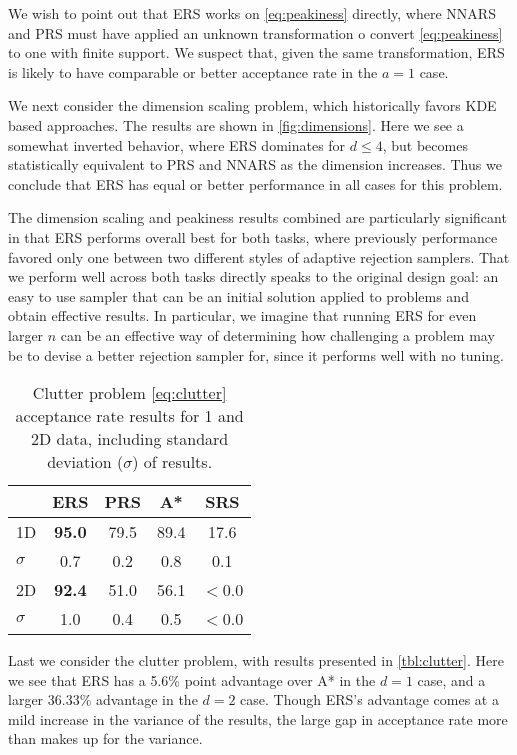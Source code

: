 \documentclass{ecai}  %
\begin{document}
We wish to point out that ERS works on \autoref{eq:peakiness} directly, where NNARS and PRS must have applied an unknown transformation o convert \autoref{eq:peakiness} to one with finite support. We suspect that, given the same transformation, ERS is likely to have comparable or better acceptance rate in the $a = 1$ case. 


We next consider the dimension scaling problem, which historically favors KDE based approaches.  The results are shown in \autoref{fig:dimensions}. Here we see a somewhat inverted behavior, where ERS dominates for $d \leq 4$, but becomes statistically equivalent to PRS and NNARS as the dimension increases. Thus we conclude that ERS has equal or better performance in all cases for this problem. 


The dimension scaling and peakiness results combined are particularly significant in that ERS performs overall best for both tasks, where previously performance favored only one between two different styles of adaptive rejection samplers. That we perform well across both tasks directly speaks to the original design goal: an easy to use sampler that can be an initial solution applied to problems and obtain effective results. In particular, we imagine that running ERS for even larger $n$ can be an effective way of determining how challenging a problem may be to devise a better rejection sampler for, since it performs well with no tuning. 

%
\begin{wraptable}[10]{r}{0.6\columnwidth}
\vspace{-15pt}
\centering
\caption{Clutter problem \autoref{eq:clutter} acceptance rate results for 1 and 2D data, including standard deviation  ($\sigma$) of results. } \label{tbl:clutter}
\begin{tabular}{@{}lcccc@{}}
\toprule
         & ERS  & PRS  & A*   & SRS  \\ \midrule
1D       & \textbf{95.0} & 79.5 & 89.4 & 17.6 \\
$\sigma$ & 0.7  & 0.2  & 0.8  & 0.1  \\
2D       & \textbf{92.4} & 51.0 & 56.1 & $<$0.0 \\
$\sigma$ & 1.0  & 0.4  & 0.5  & $<$0.0 \\ \bottomrule
\end{tabular}
\end{wraptable}

Last we consider the clutter problem, with results presented in \autoref{tbl:clutter}. Here we see that ERS has a 5.6\% point advantage over A* in the $d=1$ case, and a larger 36.33\% advantage in the $d=2$ case. Though ERS's advantage comes at a mild increase in the variance of the results, the large gap in acceptance rate more than makes up for the variance.  
\end{document}
